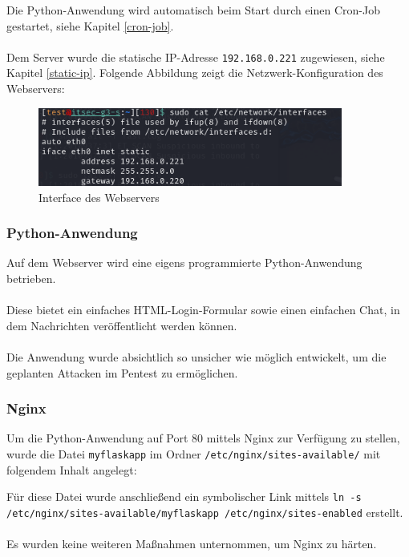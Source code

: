 \documentclass[
    a4paper,
    pagesize,
	pdftex,
    12pt,
]{scrartcl}
\begin{document}
Die Python-Anwendung wird automatisch beim Start durch einen Cron-Job gestartet, siehe Kapitel \ref{cron-job}. \\ \\
Dem Server wurde die statische IP-Adresse \lstinline[breaklines]|192.168.0.221| zugewiesen, siehe Kapitel \ref{static-ip}. Folgende Abbildung zeigt die Netzwerk-Konfiguration des Webservers:
\begin{figure}[!ht]
	\centering
	\includegraphics[width=10cm]{interface-webserver.png}
	\caption{Interface des Webservers}
	\label{fig:interface-webserver}
\end{figure}

\subsubsection{Python-Anwendung}
Auf dem Webserver wird eine eigens programmierte Python-Anwendung betrieben. \\ \\
Diese bietet ein einfaches HTML-Login-Formular sowie einen einfachen Chat, in dem Nachrichten veröffentlicht werden können. \\ \\
Die Anwendung wurde absichtlich so unsicher wie möglich entwickelt, um die geplanten Attacken im Pentest zu ermöglichen.

\subsubsection{Nginx}
Um die Python-Anwendung auf Port 80 mittels Nginx zur Verfügung zu stellen, wurde die Datei \lstinline[breaklines]|myflaskapp| im Ordner \lstinline[breaklines]|/etc/nginx/sites-available/| mit folgendem Inhalt angelegt:

Für diese Datei wurde anschließend ein symbolischer Link mittels 
\lstinline[breaklines]|ln -s /etc/nginx/sites-available/myflaskapp /etc/nginx/sites-enabled| erstellt. \\ \\
Es wurden keine weiteren Maßnahmen unternommen, um Nginx zu härten.
\end{document}
